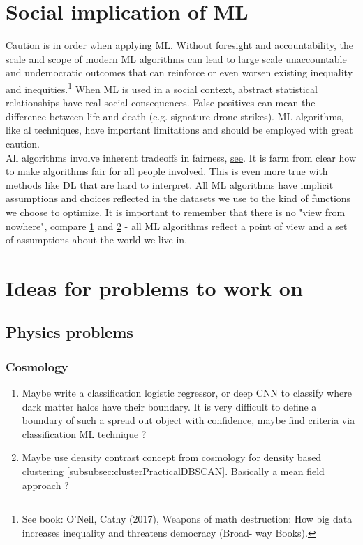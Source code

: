 \chapter{Social implication of ML}
Caution is in order when applying ML. Without foresight and accountability, the scale and scope of modern ML algorithms can lead to large scale unaccountable and undemocratic outcomes that can reinforce or even worsen existing inequality and inequities.\footnote{See book: O’Neil, Cathy (2017), Weapons of math destruction: How big
	data increases inequality and threatens democracy (Broad-
	way Books).}
When ML is used in a social context, abstract statistical relationships have real social consequences. False positives can mean the difference between life and death (e.g. signature drone strikes). ML algorithms, like al techniques, have important limitations and should be employed with great caution.\\
All algorithms involve inherent tradeoffs in fairness, \href{https://arxiv.org/abs/1609.05807}{see}. It is farm from clear how to make algorithms fair for all people involved. This is even more true with methods like DL that are hard to interpret. All ML algorithms have implicit assumptions and choices reflected in the datasets we use to the kind of functions we choose to optimize. It is important to remember that there is no "view from nowhere", compare \href{https://course.ccs.neu.edu/cs5150f14/readings/adam-artificialknowing.pdf}{1} and \href{https://papers.ssrn.com/sol3/papers.cfm?abstract_id=3078224}{2} - all ML algorithms reflect a point of view and a set of assumptions about the world we live in.








\chapter{Ideas for problems to work on}
\section{Physics problems}
\subsection{Cosmology}
\begin{enumerate}
	\item Maybe write a classification logistic regressor, or deep CNN to classify where dark matter halos have their boundary. It is very difficult to define a boundary of such a spread out object with confidence, maybe find criteria via classification ML technique ?
\item Maybe use density contrast concept from cosmology for density based clustering \ref{subsubsec:clusterPracticalDBSCAN}. Basically a mean field approach ?
\end{enumerate}
